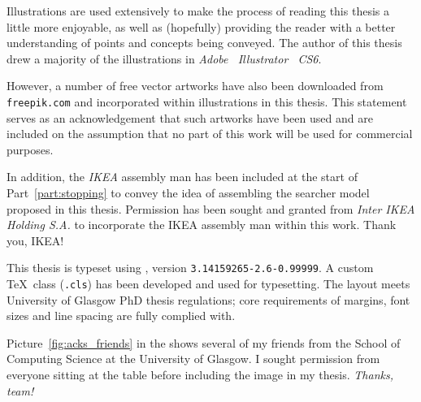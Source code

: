 \begin{preamble}
\noindent{}
Illustrations are used extensively to make the process of reading this thesis a little more enjoyable, as well as (hopefully) providing the reader with a better understanding of points and concepts being conveyed. The author of this thesis drew a majority of the illustrations in \emph{Adobe \textregistered~Illustrator \textregistered~CS6}.

However, a number of free vector artworks have also been downloaded from \texttt{freepik.com} and incorporated within illustrations in this thesis. This statement serves as an acknowledgement that such artworks have been used and are included on the assumption that no part of this work will be used for commercial purposes.

In addition, the \emph{IKEA} assembly man has been included at the start of Part~\ref{part:stopping} to convey the idea of assembling the searcher model proposed in this thesis. Permission has been sought and granted from \emph{Inter IKEA Holding S.A.} to incorporate the IKEA assembly man within this work. Thank you, IKEA!

\noindent{}
This thesis is typeset using \XeTeX, version \texttt{3.14159265-2.6-0.99999}. A custom \TeX\ class (\texttt{.cls}) has been developed and used for typesetting. The layout meets University of Glasgow PhD thesis regulations; core requirements of margins, font sizes and line spacing are fully complied with.

Picture~\ref{fig:acks_friends} in the  shows several of my friends from the School of Computing Science at the University of Glasgow. I sought permission from everyone sitting at the table before including the image in my thesis. \emph{Thanks, team!}

\end{preamble}

\newpage
\thispagestyle{empty}
\mbox{}
\newpage
\thispagestyle{empty}
\mbox{}
\newpage